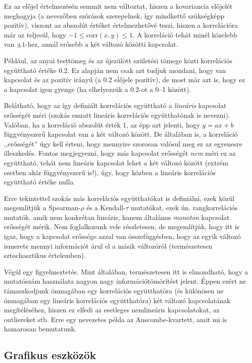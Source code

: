 \documentclass[
]{book}
\begin{document}
Ez az előjel értelmezésén semmit nem változtat, hiszen a kovariancia előjelét meghagyja (a nevezőben szórások szerepelnek, így mindkettő szükségképp pozitív), viszont az abszolút értéket értelmezhetővé teszi, hiszen a korrelációra már az teljesül, hogy \(-1 \leq \mathrm{corr}\left(x,y\right) \leq 1\). A korreláció tehát minél közelebb van \(\pm 1\)-hez, annál erősebb a két változó közötti kapcsolat.

Például, az anyai testtömeg és az újszülött születési tömege közti korrelációs együttható értéke 0.2. Ez alapján nem csak azt tudjuk mondani, hogy van kapcsolat és az pozitív irányú (a 0.2 előjele pozitív), de most már azt is, hogy ez a kapcsolat igen gyenge (ha elhelyezzük a 0.2-ot a 0--1 között).

Belátható, hogy az így definiált korrelációs együttható a \emph{lineáris} kapcsolat erősségét méri (szokás emiatt lineáris korrelációs együtthatónak is nevezni). Valóban, ha a korreláció abszolút érték 1, az épp azt jelenti, hogy \(y=ax+b\) függvényszerű kapcsolat van a két változó között. De általában is, a korreláció ,,erősségét'' úgy kell érteni, hogy mennyire szorosan valósul meg ez az egyenesre illeszkedés. Fontos megjegyezni, hogy más kapcsolat erősségét \emph{nem} méri ez az együttható, tehát nem lineáris kapcsolat lehet a két változó között (extrém esetben akár függvényszerű is!), úgy, hogy közben a lineáris korrelációs együttható értéke nulla.

Erre tekintettel szokás más korrelációs együtthatókat is definiálni, ezek közül megemlítjük a Spearman-\(\rho\) és a Kendall-\(\tau\) mutatókat, ezek ún. rangkorrelációs mutatók, amik nem konkrétan lineáris, hanem általános \emph{monoton} kapcsolat erősségét mérik. Nem foglalkozunk vele részletesen, de megemlítjük, hogy itt is igaz, hogy a kapcsolat erőssége azzal van összefüggésben, hogy az egyik változó ismerete mennyi információt árul el a másik változóról (természetesen sztochasztikus értelemben).

Végül egy figyelmeztetés. Mint általában, természetesen itt is elmondható, hogy a mutatószám használata nagyon nagy információtömörítést jelent. Éppen ezért ne támaszkodjunk önmagában egy korrelációs együtthatóra (és különösen ne önmagában egy lineáris korrelációs együtthatóra) két változó kapcsolatának megítéléséhez, hiszen ez elfedi az esetleges nemlineáris kapcsolatokat, az outliereket stb. Erre egy nevezetes példa az Anscombe-kvartett, amit mi is hamarosan bemutatunk.

\hypertarget{deskriptivmennyketvaltvaltgrafikus}{%
\subsection{Grafikus eszközök}\label{deskriptivmennyketvaltvaltgrafikus}}
\end{document}
